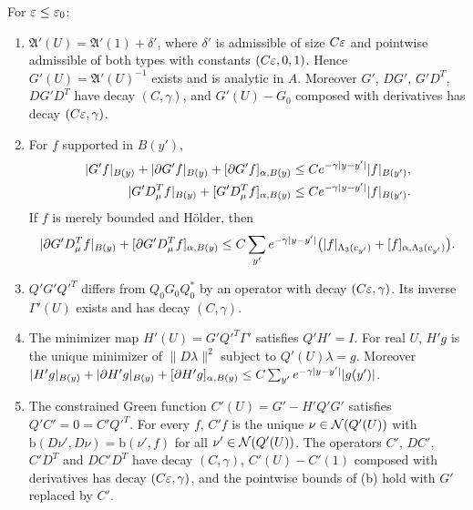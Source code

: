 \begin{theorem}\label{thm:cov-scalar}
For $\varepsilon\le\varepsilon_0$:
\begin{enumerate}[label=(\alph*)]
\item $\mathfrak A'(U)=\mathfrak A'(1)+\delta'$, where $\delta'$ is admissible of size $C\varepsilon$ and pointwise admissible of both types with constants $(C\varepsilon,0,1)$. Hence $G'(U)=\mathfrak A'(U)^{-1}$ exists and is analytic in $A$. Moreover $G'$, $DG'$, $G'D^T$, $DG'D^T$ have decay $(C,\gamma)$, and $G'(U)-G_0$ composed with derivatives has decay $(C\varepsilon,\gamma)$.
\item For $f$ supported in $B(y')$,
\begin{align*}
|G'f|_{B(y)}+|\partial G'f|_{B(y)}+[\partial G'f]_{\alpha,B(y)}&\le Ce^{-\gamma|y-y'|}|f|_{B(y')},\\
|G'D_\mu^Tf|_{B(y)}+[G'D_\mu^Tf]_{\alpha,B(y)}&\le Ce^{-\gamma|y-y'|}|f|_{B(y')}.
\end{align*}
If $f$ is merely bounded and H\"older, then
\[
|\partial G'D^T_\mu f|_{B(y)}+[\partial G'D^T_\mu f]_{\alpha,B(y)}\le C\sum_{y'}e^{-\gamma|y-y'|}\big(|f|_{\Lambda_3(c_{y'})}+[f]_{\alpha,\Lambda_3(c_{y'})}\big).
\]
\item $Q'G'Q'^T$ differs from $Q_0G_0Q_0^*$ by an operator with decay $(C\varepsilon,\gamma)$. Its inverse $\Gamma'(U)$ exists and has decay $(C,\gamma)$.
\item The minimizer map $H'(U)=G'Q'^T\Gamma'$ satisfies $Q'H'=I$. For real $U$, $H'g$ is the unique minimizer of $\|D\lambda\|^2$ subject to $Q'(U)\lambda=g$. Moreover $|H'g|_{B(y)}+|\partial H'g|_{B(y)}+[\partial H'g]_{\alpha,B(y)}\le C\sum_{y'}e^{-\gamma|y-y'|}|g(y')|$.
\item The constrained Green function $C'(U)=G'-H'Q'G'$ satisfies $Q'C'=0=C'Q'^T$. For every $f$, $C'f$ is the unique $\nu\in\mathcal N(Q'(U))$ with $\mathrm b(D\nu',D\nu)=\mathrm b(\nu',f)$ for all $\nu'\in\mathcal N(Q'(U))$. The operators $C'$, $DC'$, $C'D^T$ and $DC'D^T$ have decay $(C,\gamma)$, $C'(U)-C'(1)$ composed with derivatives has decay $(C\varepsilon,\gamma)$, and the pointwise bounds of (b) hold with $G'$ replaced by $C'$.
\end{enumerate}
\end{theorem}

